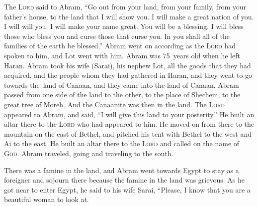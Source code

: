 
\begin{inparaenum}
     The \textsc{Lord} said to Abram, ``Go out from your land, from your family, from your father's house, to the land that I will show you.%
     I will make a great nation of you. I will will you. I will make your name great. You will be a blessing.%
     I will bless those who bless you and curse those that curse you. In you shall all of the families of the earth be blessed.''%
     Abram went on according as the \textsc{Lord} had spoken to him, and Lot went with him. Abram was 75~years old when he left Haran.%
     Abram took his wife (Sarai), his nephew Lot, all the goods that they had acquired, and the people whom they had gathered in Haran, and they went to go towards the\understood\ land of Canaan, and they came into the land of Canaan.%
     Abram passed from one side of the land to the other, to the place of Shechem, to the great tree of Moreh. And the Canaanite was then in the land.%
     The \textsc{Lord} appeared to Abram, and said, ``I will give this land to your posterity.'' He built an altar there to the \textsc{Lord} who had appeared to him.%
     He moved on from there to the mountain on the east of Bethel, and pitched his tent with Bethel to the west and Ai to the east. He built an altar there to the \textsc{Lord} and called on the name of \textsc{God}.%
     Abram traveled, going and traveling to the south.%
    
     There was a famine in the land, and Abram went towards Egypt to stay as a foreigner and sojourn there because the famine in the land was grievous.%
     As he got near to enter Egypt, he said to his wife Sarai, ``Please, I know that you are a beautiful woman to look at.%
\end{inparaenum}
